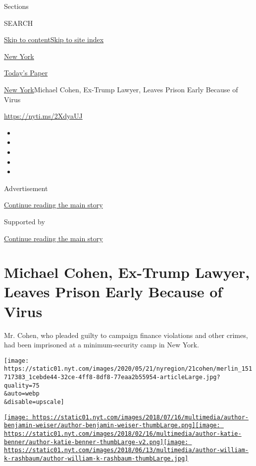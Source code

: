 Sections

SEARCH

\protect\hyperlink{site-content}{Skip to
content}\protect\hyperlink{site-index}{Skip to site index}

\href{https://www.nytimes.com/section/nyregion}{New York}

\href{https://myaccount.nytimes.com/auth/login?response_type=cookie\&client_id=vi}{}

\href{https://www.nytimes.com/section/todayspaper}{Today's Paper}

\href{/section/nyregion}{New York}\textbar{}Michael Cohen, Ex-Trump
Lawyer, Leaves Prison Early Because of Virus

\url{https://nyti.ms/2XdyaUJ}

\begin{itemize}
\item
\item
\item
\item
\item
\end{itemize}

Advertisement

\protect\hyperlink{after-top}{Continue reading the main story}

Supported by

\protect\hyperlink{after-sponsor}{Continue reading the main story}

\hypertarget{michael-cohen-ex-trump-lawyer-leaves-prison-early-because-of-virus}{%
\section{Michael Cohen, Ex-Trump Lawyer, Leaves Prison Early Because of
Virus}\label{michael-cohen-ex-trump-lawyer-leaves-prison-early-because-of-virus}}

Mr. Cohen, who pleaded guilty to campaign finance violations and other
crimes, had been imprisoned at a minimum-security camp in New York.

\texttt{[image: https://static01.nyt.com/images/2020/05/21/nyregion/21cohen/merlin\_151717383\_1cebde44-32ce-4ff8-8df8-77eaa2b55954-articleLarge.jpg?quality=75\\\&auto=webp\\\&disable=upscale]}

\href{https://www.nytimes.com/by/benjamin-weiser}{\texttt{[image: https://static01.nyt.com/images/2018/07/16/multimedia/author-benjamin-weiser/author-benjamin-weiser-thumbLarge.png]}}\href{https://www.nytimes.com/by/katie-benner}{\texttt{[image: https://static01.nyt.com/images/2018/02/16/multimedia/author-katie-benner/author-katie-benner-thumbLarge-v2.png]}}\href{https://www.nytimes.com/by/william-k-rashbaum}{\texttt{[image: https://static01.nyt.com/images/2018/06/13/multimedia/author-william-k-rashbaum/author-william-k-rashbaum-thumbLarge.jpg]}}

